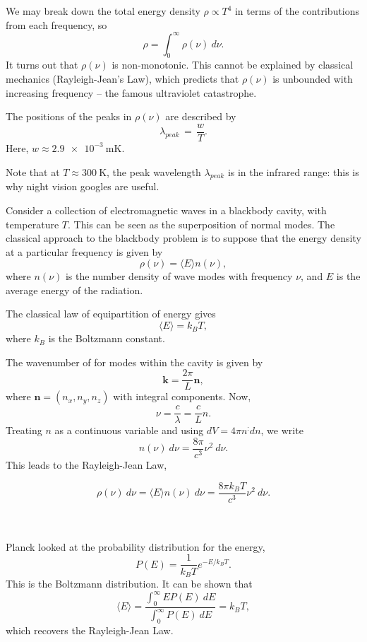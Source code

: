 \documentclass[11pt]{article}
\newcommand\ve[1]{\boldsymbol{#1}}
\newcommand\E[1]{\langle #1 \rangle}
\theoremstyle{definition}
\newenvironment{boxedeq}%
    {\begin{equationbox}\begin{equation}}%
    {\end{equation}\end{equationbox}}
\theoremstyle{remark}
\numberwithin{equation}{section}
\begin{document}
    We may break down the total energy density $\rho \propto T^4$ in terms of the
    contributions from each frequency, so \[
        \rho = \int_0^\infty \rho(\nu) \:d\nu.
    \] 
    It turns out that $\rho(\nu)$ is non-monotonic. This cannot be explained by
    classical mechanics (Rayleigh-Jean's Law), which predicts that $\rho(\nu)$
    is unbounded with increasing frequency -- the famous ultraviolet catastrophe.

    \begin{theorem}
        The positions of the peaks in $\rho(\nu)$ are described by \[
            \lambda_{peak} \,=\, \frac{w}{T}.
        \]
        Here, $w \approx \SI{2.9e-3}{\milli\kelvin}$.  
    \end{theorem}
    Note that at $T \approx \SI{300}{\kelvin}$, the peak wavelength $\lambda_{peak}$
    is in the infrared range: this is why night vision googles are useful.
    
    Consider a collection of electromagnetic waves in a blackbody cavity, with
    temperature $T$. This can be seen as the superposition of normal modes.
    The classical approach to the blackbody problem is to suppose that the energy
    density at a particular frequency is given by \[
        \rho(\nu) = \E{E} n(\nu),
    \] where $n(\nu)$ is the number density of wave modes with frequency $\nu$, and
    $E$ is the average energy of the radiation.

    The classical law of equipartition of energy gives \[
        \E{E} = k_B T,
    \] where $k_B$ is the Boltzmann constant.

    The wavenumber of for modes within the cavity is given by \[
        \ve{k} = \frac{2\pi}{L}\ve{n},
    \] where $\ve{n} = (n_x, n_y, n_z)$ with integral components. Now, \[
        \nu = \frac{c}{\lambda} = \frac{c}{L}n.
    \] Treating $n$ as a continuous variable and using $dV = 4\pi n^:dn$, we write
    \[
        n(\nu)\:d\nu = \frac{8\pi}{c^3}\nu^2\:d\nu.
    \] This leads to the Rayleigh-Jean Law,
    \begin{boxedeq}
        \rho(\nu)\:d\nu = \E{E} n(\nu) \:d\nu 
            = \frac{8\pi k_B T}{c^3}\nu^2\:d\nu.
    \end{boxedeq}\\~\\

    Planck looked at the probability distribution for the energy, \[
        P(E) = \frac{1}{k_B T}e^{-E /k_B T}.
    \] This is the Boltzmann distribution. It can be shown that \[
        \E{E} = \frac{\int_0^\infty E P(E) \:dE}{\int_0^\infty P(E) \: dE} 
        = k_B T,
    \] which recovers the Rayleigh-Jean Law.
\end{document}
